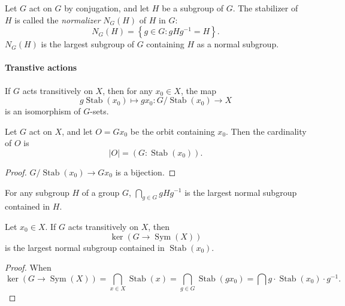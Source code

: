 \begin{example}
  Let \( G \) act on \( G \) by conjugation, and let \( H \) be a subgroup of \( G \).
  The stabilizer of \( H \) is called the \emph{normalizer} \( N_G(H) \) of \( H \) in \( G \):
  \[
    N_G(H) = \left\lbrace g \in G: g H g^{-1} = H \right\rbrace.
  \]
  \( N_G(H) \) is the largest subgroup of \( G \) containing \( H \) as a normal subgroup.
\end{example}

\paragraph{Transtive actions}

\begin{proposition}
  If \( G \) acts transitively on \( X \), then for any \( x_0 \in X \), the map
  \[
    g \operatorname{Stab}(x_0) \mapsto gx_0: G / \operatorname{Stab}(x_0) \to X
  \]
  is an isomorphism of \( G \)-sets.
\end{proposition}

\begin{corollary}
  Let \( G \) act on \( X \), and let \( O = Gx_0 \) be the orbit containing \( x_0 \).
  Then the cardinality of \( O \) is
  \[
    \left\vert O \right\vert = (G: \operatorname{Stab}(x_0)).
  \]
\end{corollary}
\begin{proof}
  \( G / \operatorname{Stab}(x_0) \to Gx_0 \) is a bijection.
\end{proof}

\begin{lemma}
  For any subgroup \( H \) of a group \( G \), \( \bigcap_{g \in G}g H g^{-1} \) is the largest normal subgroup contained in \( H \).
\end{lemma}

\begin{proposition}
  Let \( x_0 \in X \).
  If \( G \) acts transitively on \( X \), then
  \[
    \ker (G \to \operatorname{Sym}(X))
  \]
  is the largest normal subgroup contained in \( \operatorname{Stab}(x_0) \).
\end{proposition}

\begin{proof}
  When
  \[
    \ker(G \to \operatorname{Sym}(X)) = \bigcap_{x \in X} \operatorname{Stab}(x) = \bigcap_{g \in G}\operatorname{Stab}(gx_0) = \bigcap g \cdot \operatorname{Stab}(x_0) \cdot g^{-1}.
  \]
\end{proof}

